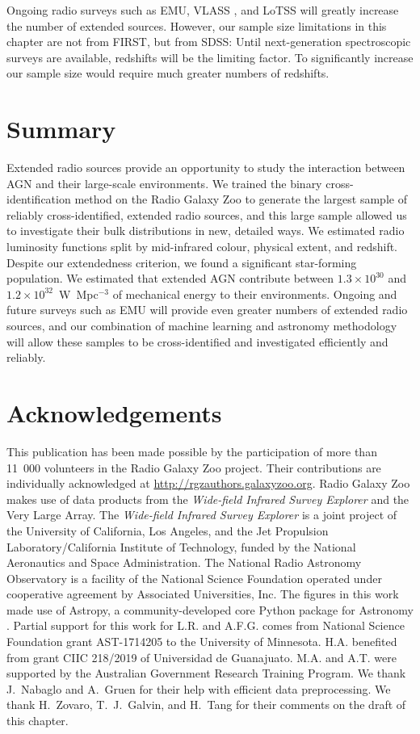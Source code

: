     Ongoing radio surveys such as EMU, VLASS \citep{lacy20vlass}, and LoTSS \linebreak \citep{shimwell19lotss} will greatly increase the number of extended sources. However, our sample size limitations in this chapter are not from FIRST, but from SDSS: Until next-generation spectroscopic surveys are available, redshifts will be the limiting factor. To significantly increase our sample size would require much greater numbers of redshifts.

\section{Summary}\label{sec:rlfs-summary}

  Extended radio sources provide an opportunity to study the interaction between AGN and their large-scale environments. We trained the binary cross-identification method on the Radio Galaxy Zoo to generate the largest sample of reliably cross-identified, extended radio sources, and this large sample allowed us to investigate their bulk distributions in new, detailed ways. We estimated radio luminosity functions split by mid-infrared colour, physical extent, and redshift. Despite our extendedness criterion, we found a significant star-forming population. We estimated that extended AGN contribute between $1.3 \times 10^{30}$ and $1.2 \times 10^{32}$~W~Mpc$^{-3}$ of mechanical energy to their environments. Ongoing and future surveys such as EMU will provide even greater numbers of extended radio sources, and our combination of machine learning and astronomy methodology will allow these samples to be cross-identified and investigated efficiently and reliably.

\section{Acknowledgements}

This publication has been made possible by the participation of more than
11~000 volunteers in the Radio Galaxy Zoo project. Their contributions are
individually acknowledged at \url{http://rgzauthors.galaxyzoo.org}. Radio
Galaxy Zoo makes use of data products from the \emph{Wide-field Infrared Survey
Explorer} and the Very Large Array. The \emph{Wide-field Infrared Survey Explorer}
is a joint project of the University of California, Los Angeles, and the Jet
Propulsion Laboratory/California Institute of Technology, funded by the
National Aeronautics and Space Administration. The National Radio Astronomy
Observatory is a facility of the National Science Foundation operated under
cooperative agreement by Associated Universities, Inc. The figures in this
work made use of Astropy, a community-developed core Python package for
Astronomy \citep{astropy}. Partial support for this work for L.R. and A.F.G. comes from National Science Foundation grant AST-1714205 to the University of Minnesota. H.A. benefited from grant CIIC 218/2019 of Universidad de Guanajuato. M.A. and A.T. were supported by the Australian Government Research Training Program. We thank J.~Nabaglo and A.~Gruen for their help with efficient data preprocessing. We thank H.~Zovaro, T.~J.~Galvin, and H.~Tang for their comments on the draft of this chapter.


